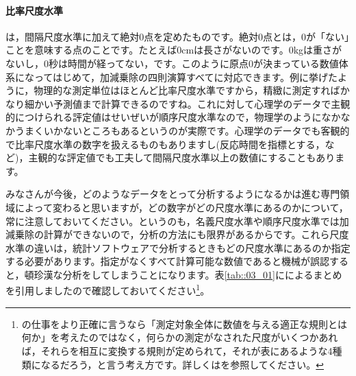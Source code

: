 \documentclass{ltjsbook}
\begin{document}
\paragraph{比率尺度水準}
は，間隔尺度水準に加えて絶対0点を定めたものです。絶対0点とは，0が「ない」ことを意味する点のことです。たとえば0cmは長さがないのです。0kgは重さがないし，0秒は時間が経ってない，です。このように原点0が決まっている数値体系になってはじめて，加減乗除の四則演算すべてに対応できます。例に挙げたように，物理的な測定単位はほとんど比率尺度水準ですから，精緻に測定すればかなり細かい予測値まで計算できるのですね。これに対して心理学のデータで主観的につけられる評定値はせいぜいが順序尺度水準なので，物理学のようになかなかうまくいかないところもあるというのが実際です。心理学のデータでも客観的で比率尺度水準の数字を扱えるものもありますし(反応時間を指標とする，など)，主観的な評定値でも工夫して間隔尺度水準以上の数値にすることもあります。

みなさんが今後，どのようなデータをとって分析するようになるかは進む専門領域によって変わると思いますが，どの数字がどの尺度水準にあるのかについて，常に注意しておいてください。というのも，名義尺度水準や順序尺度水準では加減乗除の計算ができないので，分析の方法にも限界があるからです。これら尺度水準の違いは，統計ソフトウェアで分析するときもどの尺度水準にあるのか指定する必要があります。指定がなくすべて計算可能な数値であると機械が誤認すると，頓珍漢な分析をしてしまうことになります。表\ref{tab::03_01}に\textcite{stevens1946}によるまとめを引用しましたので確認しておいてください\footnote{\textcite{stevens1946}の仕事をより正確に言うなら「測定対象全体に数値を与える適正な規則とは何か」を考えたのではなく，何らかの測定がなされた尺度がいくつかあれば，それらを相互に変換する規則が定められて，それが表にあるような4種類になるだろう，と言う考え方です。詳しくは\textcite{Yoshino2007}を参照してください。}。
\end{document}
